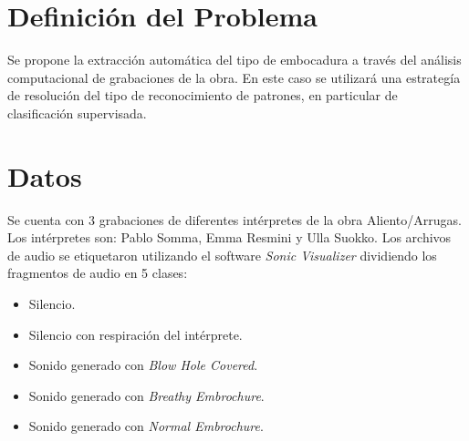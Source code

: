 \documentclass{article}
\begin{document}
\section*{Definición del Problema}
Se propone la extracción automática del tipo de embocadura a través del análisis computacional de grabaciones de la obra. En este caso se utilizará una estrategía de resolución del tipo de reconocimiento de patrones, en particular de clasificación supervisada. 

\section*{Datos}
Se cuenta con 3 grabaciones de diferentes intérpretes de la obra Aliento/Arrugas. Los intérpretes son: Pablo Somma, Emma Resmini y Ulla Suokko. Los archivos de audio se etiquetaron utilizando el software \textit{Sonic Visualizer} dividiendo los fragmentos de audio en 5 clases:

\begin{itemize} 
  \item Silencio.
  \item Silencio con respiración del intérprete. 
  \item Sonido generado con \textit{Blow Hole Covered}.
  \item Sonido generado con \textit{Breathy Embrochure}.
  \item Sonido generado con \textit{Normal Embrochure}.
\end{itemize}





\newpage




\end{document}
